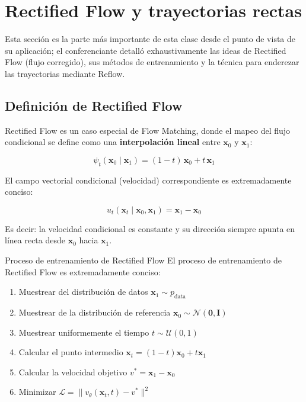 \section{Rectified Flow y trayectorias rectas}

Esta sección es la parte más importante de esta clase desde el punto de vista de su aplicación; el conferenciante detalló exhaustivamente las ideas de Rectified Flow (flujo corregido), sus métodos de entrenamiento y la técnica para enderezar las trayectorias mediante Reflow.

\subsection{Definición de Rectified Flow}

Rectified Flow es un caso especial de Flow Matching, donde el mapeo del flujo condicional se define como una \textbf{interpolación lineal} entre $\mathbf{x}_0$ y $\mathbf{x}_1$:

$$\psi_t(\mathbf{x}_0 \mid \mathbf{x}_1) = (1 - t)\, \mathbf{x}_0 + t\, \mathbf{x}_1$$

El campo vectorial condicional (velocidad) correspondiente es extremadamente conciso:

$$u_t(\mathbf{x}_t \mid \mathbf{x}_0, \mathbf{x}_1) = \mathbf{x}_1 - \mathbf{x}_0$$

Es decir: la velocidad condicional es constante y su dirección siempre apunta en línea recta desde $\mathbf{x}_0$ hacia $\mathbf{x}_1$.

\begin{importantbox}{Proceso de entrenamiento de Rectified Flow}
El proceso de entrenamiento de Rectified Flow es extremadamente conciso:
\begin{enumerate}
    \item Muestrear del distribución de datos $\mathbf{x}_1 \sim p_{\text{data}}$
    \item Muestrear de la distribución de referencia $\mathbf{x}_0 \sim \mathcal{N}(\mathbf{0}, \mathbf{I})$
    \item Muestrear uniformemente el tiempo $t \sim \mathcal{U}(0, 1)$
    \item Calcular el punto intermedio $\mathbf{x}_t = (1-t)\mathbf{x}_0 + t\mathbf{x}_1$
    \item Calcular la velocidad objetivo $v^* = \mathbf{x}_1 - \mathbf{x}_0$
    \item Minimizar $\mathcal{L} = \| v_\theta(\mathbf{x}_t, t) - v^* \|^2$
\end{enumerate}
\end{importantbox}

